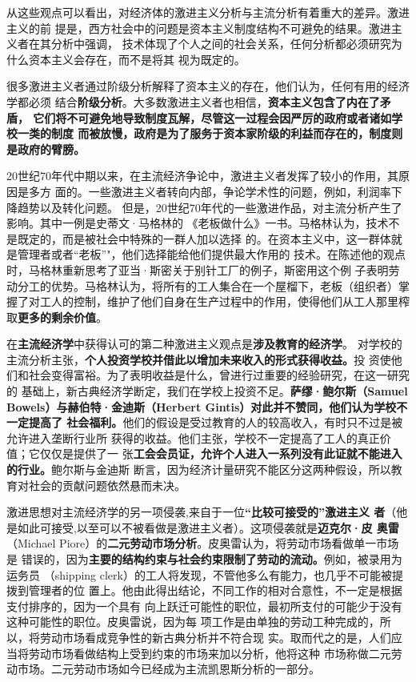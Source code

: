 从这些观点可以看出，对经济体的激进主义分析与主流分析有着重大的差异。激进主义的前
提是，西方社会中的问题是资本主义制度结构不可避免的结果。激进主义者在其分析中强调，
技术体现了个人之间的社会关系，任何分析都必须研究为什么资本主义会存在，而不是将其
视为既定的。

很多激进主义者通过阶级分析解释了资本主义的存在，他们认为，任何有用的经济学都必须
结合\textbf{阶级分析}。大多数激进主义者也相信，\textbf{资本主义包含了内在了矛盾，
  它们将不可避免地导致制度瓦解，尽管这一过程会因严厉的政府或者诸如学校一类的制度
  而被放慢，政府是为了服务于资本家阶级的利益而存在的，制度则是政府的臂膀。}

20世纪70年代中期以来，在主流经济争论中，激进主义者发挥了较小的作用，其原因是多方
面的。一些激进主义者转向内部，争论学术性的问题，例如，利润率下降趋势以及转化问题。
但是，20世纪70年代的一些激进作品，对主流分析产生了影响。其中一例是史蒂文·马格林的
《老板做什么》一书。马格林认为，技术不是既定的，而是被社会中特殊的一群人加以选择
的。在资本主义中，这一群体就是管理者或者“老板”"，他们选择能给他们提供最大作用的
技术。在陈述他的观点时，马格林重新思考了亚当·斯密关于别针工厂的例子，斯密用这个例
子表明劳动分工的优势。马格林认为，将所有的工人集合在一个屋榴下，老板（组织者）掌
握了对工人的控制，维护了他们自身在生产过程中的作用，使得他们从工人那里榨
取\textbf{更多的剩余价值}。

在\textbf{主流经济学}中获得认可的第二种激进主义观点是\textbf{涉及教育的经济学}。
对学校的主流分析主张，\textbf{个人投资学校并借此以增加未来收入的形式获得收益。}投
资使他们和社会变得富裕。为了表明收益是什么，曾进行过重要的经验研究，在这一研究的
基础上，新古典经济学断定，我们在学校上投资不足。\textbf{萨缪·鲍尔斯（Samuel
  Bowels）与赫伯特·金迪斯（Herbert Gintis）对此并不赞同，他们认为学校不一定提高了
  社会福利。}他们的假设是受过教育的人的较高收入，有时只不过是被允许进入垄断行业所
获得的收益。他们主张，学校不一定提高了工人的真正价值；它仅仅是提供了一
张\textbf{工会会员证，允许个人进入一系列没有此证就不能进入的行业。}鲍尔斯与金迪斯
断言，因为经济计量研究不能区分这两种假设，所以教育对社会的贡献问题依然悬而未决。

激进思想对主流经济学的另一项侵袭,来自于一位\textbf{“比较可接受的”激进主义
  者}（他是如此可接受,以至可以不被看做是激进主义者）。这项侵袭就是\textbf{迈克尔·皮
  奥雷}（Michael Piore）的\textbf{二元劳动市场分析}。皮奥雷认为，将劳动市场看做单一市场是
错误的，因为\textbf{主要的结构约束与社会约束限制了劳动的流动。}例如，被录用为运务员
（shipping clerk）的工人将发现，不管他多么有能力，也几乎不可能被提拨到管理者的位
置上。他由此得出结论，不同工作的相对合意性，不一定是根据支付排序的，因为一个具有
向上跃迁可能性的职位，最初所支付的可能少于没有这种可能性的职位。皮奥雷说，因为每
项工作是由单独的劳动工种完成的，所以，将劳动市场看成竞争性的新古典分析并不符合现
实。取而代之的是，人们应当将劳动市场看做结构上受到约束的市场来加以分析，他将这种
市场称做二元劳动市场。二元劳动市场如今已经成为主流凯恩斯分析的一部分。


